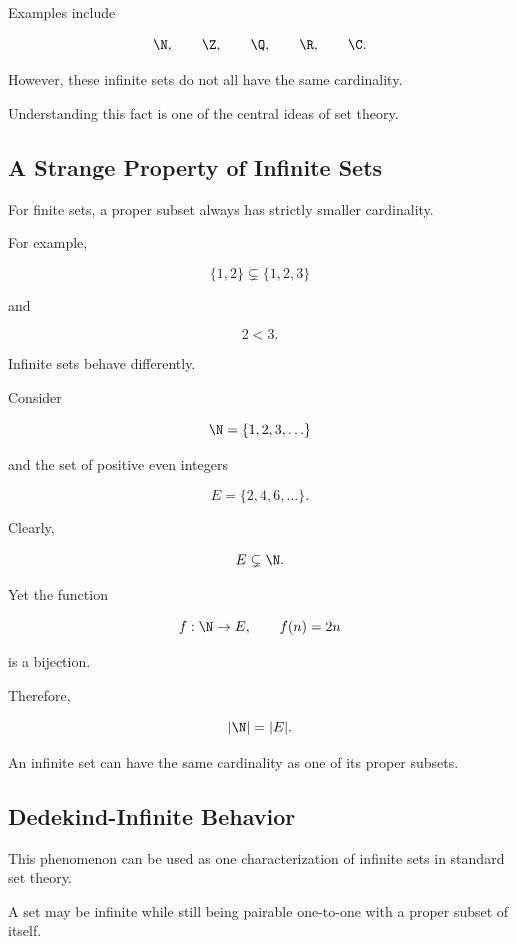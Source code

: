 Examples include

\[ \N,\qquad \Z,\qquad \Q,\qquad \R,\qquad \C. \]

However, these infinite sets do not all have the same cardinality.

Understanding this fact is one of the central ideas of set theory.

\subsection{A Strange Property of Infinite Sets}
\label{subsec:infinite-proper-subset}

For finite sets, a proper subset always has strictly smaller cardinality.

For example,

\[ \{1,2\}\subsetneq\{1,2,3\} \]

and

\[ 2<3. \]

Infinite sets behave differently.

Consider

\[ \N=\{1,2,3,\ldots\} \]

and the set of positive even integers

\[ E=\{2,4,6,\ldots\}. \]

Clearly,

\[ E\subsetneq\N. \]

Yet the function

\[ f:\N\to E,\qquad f(n)=2n \]

is a bijection.

Therefore,

\[ |\N|=|E|. \]

An infinite set can have the same cardinality as one of its proper subsets.

\subsection{Dedekind-Infinite Behavior}
\label{subsec:dedekind-infinite-preview}

This phenomenon can be used as one characterization of infinite sets in
standard set theory.

A set may be infinite while still being pairable one-to-one with a proper
subset of itself.

